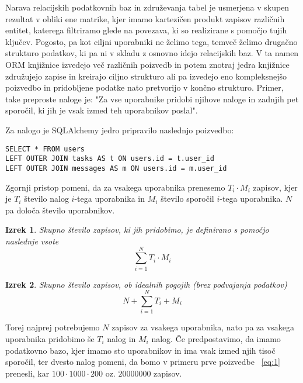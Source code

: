\documentclass[a4paper,12pt,openright]{book}
\newtheorem{izrek}{Izrek}[chapter]
\begin{document}
    Narava relacijskih podatkovnih baz in združevanja tabel je usmerjena v skupen rezultat v obliki ene matrike, kjer imamo kartezičen produkt zapisov različnih entitet, katerega filtriramo glede na povezava, ki so realizirane s pomočjo tujih ključev. Pogosto, pa kot ciljni uporabniki ne želimo tega, temveč želimo drugačno strukturo podatkov, ki pa ni v skladu z osnovno idejo relacijskih baz. V ta namen ORM knjižnice izvedejo več različnih poizvedb in potem znotraj jedra knjižnice združujejo zapise in kreirajo ciljno strukturo ali pa izvedejo eno kompleksnejšo poizvedbo in pridobljene podatke nato pretvorijo v končno strukturo. Primer, take preproste naloge je: "Za vse uporabnike pridobi njihove naloge in zadnjih pet sporočil, ki jih je vsak izmed teh uporabnikov poslal".

    \noindent
    Za nalogo je SQLAlchemy jedro pripravilo naslednjo poizvedbo:
    \begin{verbatim}
SELECT * FROM users
LEFT OUTER JOIN tasks AS t ON users.id = t.user_id
LEFT OUTER JOIN messages AS m ON users.id = m.user_id
    \end{verbatim}

    \noindent
    Zgornji pristop pomeni, da za vsakega uporabnika prenesemo $T_i \cdot M_i$ zapisov, kjer je $T_i$ število nalog $i$-tega uporabnika in $M_i$ število sporočil $i$-tega uporabnika.
    $N$ pa določa število uporabnikov.

    \begin{izrek}
        \label{iz:1}
        Skupno število zapisov, ki jih pridobimo, je definirano s pomočjo naslednje vsote
        \begin{equation}
            \sum_{i=1}^{N} T_i \cdot M_i
        \label{eq:1}
        \end{equation}
    \end{izrek}

    \begin{izrek}
        \label{iz:2}
        Skupno število zapisov, ob idealnih pogojih (brez podvajanja podatkov)
        \begin{equation}
            N + \sum_{i=1}^{N} T_i + M_i
        \label{eq:2}
        \end{equation}
    \end{izrek}

    \noindent
    Torej najprej potrebujemo $N$ zapisov za vsakega uporabnika, nato pa za vsakega uporabnika pridobimo še $T_i$ nalog in $M_i$ nalog. Če predpostavimo, da imamo podatkovno bazo, kjer imamo sto uporabnikov in ima vsak izmed njih tisoč sporočil, ter dvesto nalog pomeni, da bomo v primeru prve poizvedbe ~\eqref{eq:1} prenesli, kar $100 \cdot 1000 \cdot 200$ oz. $\num{20000000}$ zapisov.
\end{document}
